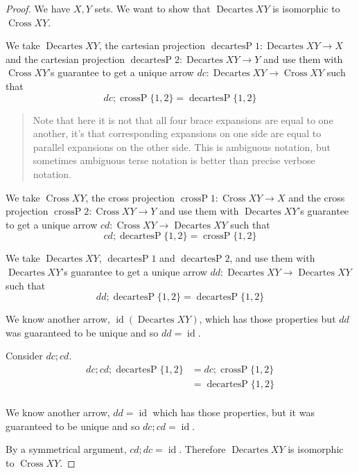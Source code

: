 \documentclass{proc-l}
\theoremstyle{definition}
\theoremstyle{remark}
\numberwithin{equation}{section}
\begin{document}
\begin{proof}

We have \(X, Y\) sets. We want to show that \(\operatorname{Decartes} X Y\) is isomorphic to \(\operatorname{Cross} X Y\).

We take
\(\operatorname{Decartes} X Y\),
the cartesian projection \(\operatorname{decartesP} 1: \operatorname{Decartes} X Y \to X\) and
the cartesian projection \(\operatorname{decartesP} 2: \operatorname{Decartes} X Y \to Y\)
and use them with \(\operatorname{Cross} X Y\)'s guarantee to get
a unique arrow \(dc: \operatorname{Decartes} X Y \to \operatorname{Cross} X Y\)
such that
\[
dc; \operatorname{crossP} \{1,2\} = \operatorname{decartesP} \{1,2\}
\]

\begin{quote}
Note that here it is not that all four brace expansions are equal to one another, it's that corresponding expansions on one side are equal to parallel expansions on the other side. This is ambiguous notation, but sometimes ambiguous terse notation is better than precise verbose notation.
\end{quote}

We take 
\(\operatorname{Cross} X Y\),
the cross projection \(\operatorname{crossP} 1: \operatorname{Cross} X Y \to X\) and
the cross projection \(\operatorname{crossP} 2: \operatorname{Cross} X Y \to Y\)
and use them with \(\operatorname{Decartes} X Y\)'s guarantee to get
a unique arrow \(cd: \operatorname{Cross} X Y \to \operatorname{Decartes} X Y\)
such that
\[
cd; \operatorname{decartesP} \{1,2\} = \operatorname{crossP} \{1,2\}
\]

We take \(\operatorname{Decartes} X Y\), \(\operatorname{decartesP} 1\) and \(\operatorname{decartesP} 2\),
and use them with \(\operatorname{Decartes} X Y\)'s guarantee to get
a unique arrow \(dd: \operatorname{Decartes} X Y \to \operatorname{Decartes} X Y\)
such that
\[
dd; \operatorname{decartesP} \{1,2\} = \operatorname{decartesP} \{1,2\}
\]

We know another arrow, \(\operatorname{id} (\operatorname{Decartes} X Y)\), which has those properties but \(dd\) was guaranteed to be unique and so \(dd = \operatorname{id}\).

Consider \(dc; cd\).
\begin{align*}
dc; cd; \operatorname{decartesP} \{1,2\} & = dc; \operatorname{crossP} \{1,2\} \\
& = \operatorname{decartesP} \{1,2\} \\
\end{align*}

We know another arrow, \(dd = \operatorname{id}\) which has those properties, 
but it was guaranteed to be unique
and so \(dc; cd = \operatorname{id}\).

By a symmetrical argument, \(cd; dc = \operatorname{id}\). Therefore \(\operatorname{Decartes} X Y\) is isomorphic to \(\operatorname{Cross} X Y\).
\end{proof}
\end{document}
